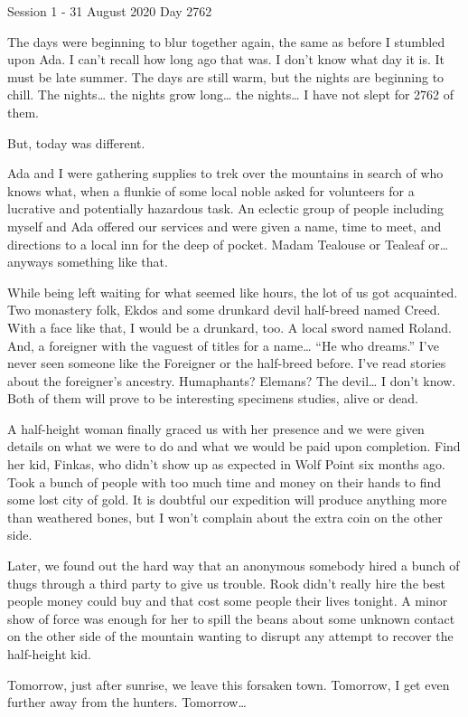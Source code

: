 Session 1 - 31 August 2020
Day 2762

The days were beginning to blur together again, the same as before I stumbled upon Ada.  I can’t recall how long ago that was.  I don’t know what day it is.  It must be late summer.  The days are still warm, but the nights are beginning to chill.  The nights… the nights grow long… the nights…  I have not slept for 2762 of them.  

But, today was different.

Ada and I were gathering supplies to trek over the mountains in search of who knows what, when a flunkie of some local noble asked for volunteers for a lucrative and potentially hazardous task.  An eclectic group of people including myself and Ada offered our services and were given a name, time to meet, and directions to a local inn for the deep of pocket.  Madam Tealouse or Tealeaf or… anyways something like that.

While being left waiting for what seemed like hours, the lot of us got acquainted.  Two monastery folk, Ekdos and some drunkard devil half-breed named Creed.  With a face like that, I would be a drunkard, too.  A local sword named Roland. And, a foreigner with the vaguest of titles for a name… “He who dreams.”  I’ve never seen someone like the Foreigner or the half-breed before.  I’ve read stories about the foreigner’s ancestry. Humaphants? Elemans?  The devil… I don’t know.  Both of them will prove to be interesting specimens studies, alive or dead.

A half-height woman finally graced us with her presence and we were given details on what we were to do and what we would be paid upon completion.  Find her kid, Finkas, who didn’t show up as expected in Wolf Point six months ago.  Took a bunch of people with too much time and money on their hands to find some lost city of gold.  It is doubtful our expedition will produce anything more than weathered bones, but I won’t complain about the extra coin on the other side.

Later, we found out the hard way that an anonymous somebody hired a bunch of thugs through a third party to give us trouble.  Rook didn’t really hire the best people money could buy and that cost some people their lives tonight.  A minor show of force was enough for her to spill the beans about some unknown contact on the other side of the mountain wanting to disrupt any attempt to recover the half-height kid.

Tomorrow, just after sunrise, we leave this forsaken town.  Tomorrow, I get even further away from the hunters.  Tomorrow… 
